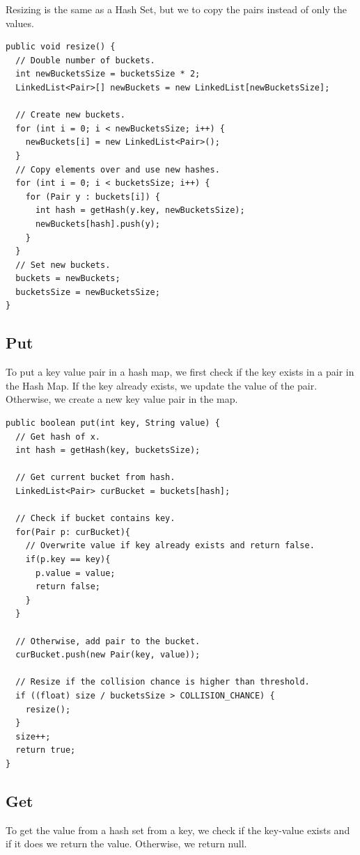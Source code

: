 \documentclass[11pt,oneside]{book}
\begin{document}
Resizing is the same as a Hash Set, but we to copy the pairs instead of only the values.

\begin{lstlisting}
public void resize() {
  // Double number of buckets.
  int newBucketsSize = bucketsSize * 2;
  LinkedList<Pair>[] newBuckets = new LinkedList[newBucketsSize];
  
  // Create new buckets.
  for (int i = 0; i < newBucketsSize; i++) {
    newBuckets[i] = new LinkedList<Pair>();
  }
  // Copy elements over and use new hashes.
  for (int i = 0; i < bucketsSize; i++) {
    for (Pair y : buckets[i]) {
      int hash = getHash(y.key, newBucketsSize);
      newBuckets[hash].push(y);
    }
  }
  // Set new buckets.
  buckets = newBuckets;
  bucketsSize = newBucketsSize;
}
\end{lstlisting}

\subsection{Put}

To put a key value pair in a hash map, we first check if the key exists in a pair in the Hash Map. If the key already exists, we update the value of the pair. Otherwise, we create a new key value pair in the map.

\begin{lstlisting}
public boolean put(int key, String value) {
  // Get hash of x.
  int hash = getHash(key, bucketsSize);

  // Get current bucket from hash.
  LinkedList<Pair> curBucket = buckets[hash];
  
  // Check if bucket contains key.
  for(Pair p: curBucket){
    // Overwrite value if key already exists and return false.
    if(p.key == key){
      p.value = value;
      return false;
    }
  }
  
  // Otherwise, add pair to the bucket.
  curBucket.push(new Pair(key, value));
  
  // Resize if the collision chance is higher than threshold.
  if ((float) size / bucketsSize > COLLISION_CHANCE) {
    resize();
  }
  size++;
  return true;
}
\end{lstlisting}

\subsection{Get}

To get the value from a hash set from a key, we check if the key-value exists and if it does we return the value. Otherwise, we return null.
\end{document}
